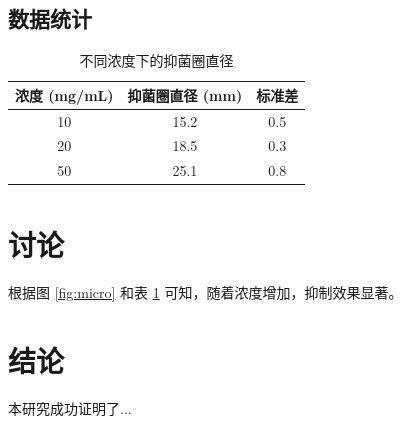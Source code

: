 \documentclass[a4paper,12pt]{ctexart} %
\begin{document}
\subsection{数据统计}
\begin{table}[H]
    \centering
    \caption{不同浓度下的抑菌圈直径}
    \begin{tabular}{ccc}
        \toprule
        浓度 (\si{mg/mL}) & 抑菌圈直径 (\si{mm}) & 标准差 \\
        \midrule
        10 & 15.2 & 0.5 \\
        20 & 18.5 & 0.3 \\
        50 & 25.1 & 0.8 \\
        \bottomrule
    \end{tabular}
    \label{tab:data}
\end{table}

\section{讨论}
根据图 \ref{fig:micro} 和表 \ref{tab:data} 可知，随着浓度增加，抑制效果显著。

\section{结论}
本研究成功证明了...

\printbibliography[title=参考文献]

\clearpage          %
\appendix           %
\end{document}
